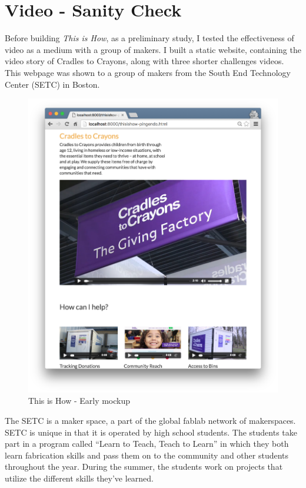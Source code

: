 \section {Video - Sanity Check}

Before building \textit{This is How}, as a preliminary study, I tested the effectiveness of video as a medium with a group of makers. I built a static website, containing the video story of Cradles to Crayons, along with three shorter challenges videos. This webpage was shown to a group of makers from the South End Technology Center (SETC) in Boston.

\begin{figure}[thpb]
   \centering
   \includegraphics[width=\textwidth]{figures/thisishow-mockup.png}
   \caption{This is How - Early mockup}
   \label{fig_thisishow_mockup}
\end{figure}

The SETC is a maker space, a part of the global fablab \cite{fablab} network of maker­spaces. SETC is unique in that it is operated by high school students. The students take part in a program called ``Learn to Teach, Teach to Learn'' in which they both learn fabrication skills and pass them on to the community and other students throughout the year. During the summer, the students work on projects that utilize the different skills they've learned.

